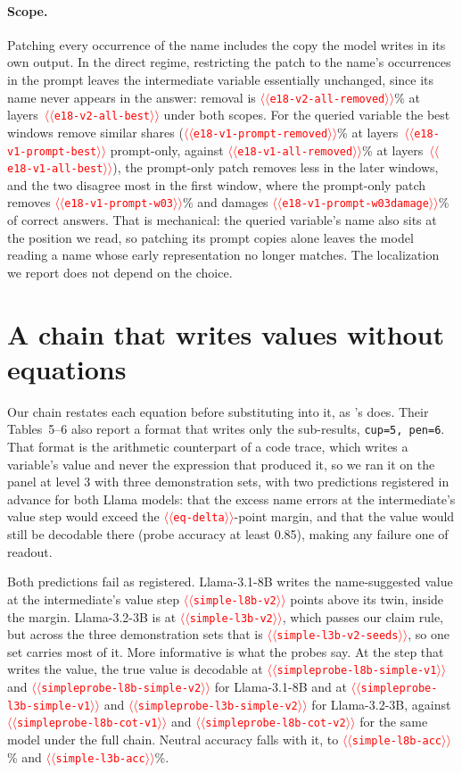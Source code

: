 \documentclass[11pt]{article}
\providecommand{\NUM}[1]{\textcolor{red}{$\langle\langle$\texttt{#1}$\rangle\rangle$}}
\begin{document}
\paragraph{Scope.} Patching every occurrence of the name includes the copy the model writes in
its own output. In the direct regime, restricting the patch to the name's occurrences in the prompt leaves the
intermediate variable essentially unchanged, since its name never appears in the answer: removal is
\NUM{e18-v2-all-removed}\% at layers~\NUM{e18-v2-all-best} under both scopes. For the queried
variable the best windows remove similar shares (\NUM{e18-v1-prompt-removed}\% at
layers~\NUM{e18-v1-prompt-best} prompt-only, against \NUM{e18-v1-all-removed}\% at
layers~\NUM{e18-v1-all-best}), the prompt-only patch removes less in the later windows, and the
two disagree most in the first window, where the prompt-only patch removes
\NUM{e18-v1-prompt-w03}\% and damages \NUM{e18-v1-prompt-w03damage}\% of correct answers. That
is mechanical: the queried variable's name also sits at the position we read, so patching its
prompt copies alone leaves the model reading a name whose early representation no longer
matches. The localization we report does not depend on the choice.

\section{A chain that writes values without equations}
\label{app:simple}

Our chain restates each equation before substituting into it, as
\citeauthor{kudo2026faithful}'s does. Their Tables~5--6 also report a format that writes only the
sub-results, \texttt{cup=5, pen=6}. That format is the arithmetic counterpart of a code trace,
which writes a variable's value and never the expression that produced it, so we ran it on the
panel at level 3 with three demonstration sets, with two predictions registered in advance for both Llama models: that
the excess name errors at the intermediate's value step would exceed the \NUM{eq-delta}-point
margin, and that the value would still be decodable there (probe accuracy at least 0.85), making
any failure one of readout.

Both predictions fail as registered. Llama-3.1-8B writes the name-suggested value at the intermediate's value
step \NUM{simple-l8b-v2} points above its twin, inside the margin. Llama-3.2-3B is at
\NUM{simple-l3b-v2}, which passes our claim rule, but across the three demonstration sets that
is \NUM{simple-l3b-v2-seeds}, so one set carries most of it. More informative is what the probes say. At
the step that writes the value, the true value is decodable at \NUM{simpleprobe-l8b-simple-v1}
and \NUM{simpleprobe-l8b-simple-v2} for Llama-3.1-8B and at
\NUM{simpleprobe-l3b-simple-v1} and \NUM{simpleprobe-l3b-simple-v2} for Llama-3.2-3B, against
\NUM{simpleprobe-l8b-cot-v1} and \NUM{simpleprobe-l8b-cot-v2} for the same model under the full
chain. Neutral accuracy falls with it, to \NUM{simple-l8b-acc}\% and \NUM{simple-l3b-acc}\%.
\end{document}
